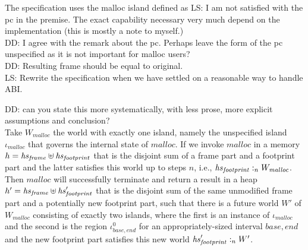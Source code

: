 \documentclass[a4paper]{article}
\newcommand\lau[1]{{\color{purple} \sf \footnotesize {LS: #1}}\\}
\newcommand\dominique[1]{{\color{purple} \sf \footnotesize {DD: #1}}\\}
\newcommand{\var}[1]{\mathit{#1}}
\newcommand{\heap}{\var{heap}}
\newcommand{\heapSat}[3][\heap]{#1 :_{#2} #3}
\newcommand{\codelabel}[1]{\mathit{#1}}
\newcommand{\malloc}{\codelabel{malloc}}
\begin{document}
The specification uses the malloc island defined as
\lau{I am not satisfied with the pc in the premise. The exact capability necessary very much depend on the implementation (this is mostly a note to myself.)}
\dominique{I agree with the remark about the pc.  Perhaps leave the form of the
  pc unspecified as it is not important for malloc users?}
\dominique{Resulting frame should be equal to original.}
\lau{Rewrite the specification when we have settled on a reasonable way to handle ABI.}

\begin{specification}[Malloc]\dominique{can you state this more systematically, with less prose, more explicit assumptions and conclusion?}
Take $W_{\malloc}$ the world with exactly one island, namely the unspecified island $\iota_{\malloc}$ that governs the internal state of $\malloc$.  If we invoke $\malloc$ in a memory $h = \hsframe \uplus \hsfoot$
that is the disjoint sum of a frame part and a footprint part and the latter satisfies this world up to steps $n$, i.e., $\heapSat[\hsfoot]{n}{W_{\malloc}}$. Then $\malloc$ will successfully terminate and return a result in a heap $h' = \hsframe \uplus \hsfoot'$ that is the disjoint sum of the same unmodified frame part and a potentially new footprint part, such that there is a future world $W'$ of $W_{\malloc}$ consisting of exactly two islands, where the first is an instance of $\iota_{\malloc}$ and the second is the region $\iota_{\var{base},\var{end}}^0$
 for an appropriately-sized interval $\var{base},\var{end}$ and the new footprint part satisfies this new world $\heapSat[\hsfoot']{n}{W'}$. 


\end{specification}
\end{document}
